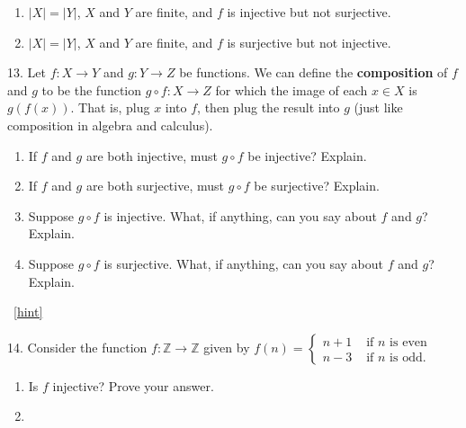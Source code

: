 \documentclass[10pt,]{book}
\newcommand{\terminology}[1]{\textbf{#1}}
\theoremstyle{plain}
\theoremstyle{definition}
\theoremstyle{definition}
\theoremstyle{definition}
\numberwithin{equation}{chapter}
\def\Z{\mathbb Z}
\newcommand{\amp}{&}
\begin{document}
\begin{exerciselist}
\begin{enumerate}[label=(\alph*)]
\item\hypertarget{li-454}{}\(|X| = |Y|\), \(X\) and \(Y\) are finite, and \(f\) is injective but not surjective.%
\item\hypertarget{li-455}{}\(|X| = |Y|\), \(X\) and \(Y\) are finite, and \(f\) is surjective but not injective.%
\end{enumerate}
%
\par\smallskip
\item[13.]\hypertarget{exercise-94}{}\hypertarget{p-2252}{}%
Let \(f:X \to Y\) and \(g:Y \to Z\) be functions.  We can define the \terminology{composition} of \(f\) and \(g\) to be the function \(g\circ f:X \to Z\) for which the image of each \(x \in X\) is \(g(f(x))\).  That is, plug \(x\) into \(f\), then plug the result into \(g\) (just like composition in algebra and calculus).%
\par
\hypertarget{p-2253}{}%
\leavevmode%
\begin{enumerate}[label=(\alph*)]
\item\hypertarget{li-462}{}\hypertarget{p-2254}{}%
If \(f\) and \(g\) are both injective, must \(g\circ f\) be injective?  Explain.%
\item\hypertarget{li-463}{}\hypertarget{p-2255}{}%
If \(f\) and \(g\) are both surjective, must \(g\circ f\) be surjective?  Explain.%
\item\hypertarget{li-464}{}\hypertarget{p-2256}{}%
Suppose \(g\circ f\) is injective.  What, if anything, can you say about \(f\) and \(g\)?  Explain.%
\item\hypertarget{li-465}{}\hypertarget{p-2257}{}%
Suppose \(g\circ f\) is surjective.  What, if anything, can you say about \(f\) and \(g\)?  Explain.%
\end{enumerate}
%
\par\smallskip
~\hfill{\tiny\hyperlink{a-B.3.13}{[hint]}\hypertarget{q-B.3.13}{}}\item[14.]\hypertarget{exercise-95}{}\hypertarget{p-2264}{}%
Consider the function \(f:\Z \to \Z\) given by \(f(n) = \begin{cases}n+1 \amp  \text{ if }n\text{ is even} \\ n-3 \amp \text{ if }n\text{ is odd} . \end{cases}\) \leavevmode%
\begin{enumerate}[label=(\alph*)]
\item\hypertarget{li-470}{}\hypertarget{p-2265}{}%
Is \(f\) injective? Prove your answer.%
\item\hypertarget{li-471}{}\hypertarget{p-2266}{}%

\end{enumerate}
\end{exerciselist}
\end{document}

